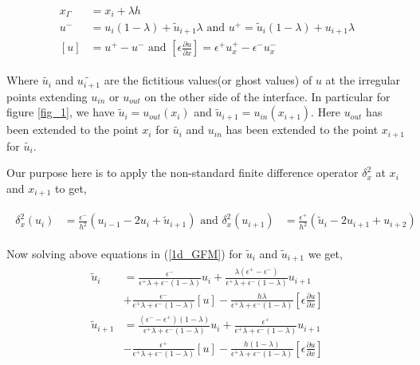 \begin{eqnarray}
\begin{aligned}
x_\Gamma &= x_i + \lambda h  \\
u^- &= u_i(1-\lambda )+ \tilde{u}_{i+1} \lambda \text{ and }u^+ = \tilde{u}_i(1-\lambda )+ u_{i+1} \lambda\\
\left[u\right]  & = u^+-u^- \text{ and }\left[ \epsilon \frac{\partial u}{\partial x} \right] =  \epsilon^+ u^+_x-\epsilon^- u^-_x
\end{aligned}\label{1d_GFM}
\end{eqnarray}
	
Where $\tilde{u_i}$ and $\tilde{u_{i+1}}$ are the fictitious values(or ghost values) of $u$ at the irregular points extending $u_{in}$ or $u_{out}$ on the other side of the interface. In particular for figure \ref{fig_1},  we have $\tilde{u}_i=u_{out}(x_i)$ and $\tilde{u}_{i+1}=u_{in}(x_{i+1})$. Here $u_{out}$ has been extended to the point $x_i$ for $\tilde{u_i}$ and $u_{in}$ has been extended to the point $x_{i+1}$ for $\tilde{u_i}$. 

Our purpose here is to apply the non-standard finite difference operator $\delta_x^2$ at $x_i$ and $x_{i+1}$ to get, 

\begin{eqnarray}
	\begin{aligned}
		\delta_x^2\left(u_{i}\right)&= \frac{\epsilon^-}{h^2} \left(u_{i-1}-2u_{i}+\tilde{u}_{i+1}\right)\text{ and }\delta_x^2\left(u_{i+1}\right)&= \frac{\epsilon^+}{h^2} \left(\tilde{u}_{i}-2u_{i+1}+u_{i+2}\right)
	\end{aligned}\label{fnt-op}
\end{eqnarray}

Now solving above equations in (\ref{1d_GFM})  for $\tilde{u}_i $ and $\tilde{u}_{i+1}$ we get, 
\begin{eqnarray}
\begin{aligned}
	\tilde{u}_i&= \frac{\epsilon^-}{\epsilon^+\lambda+\epsilon^-(1-\lambda)}u_i +\frac{\lambda(\epsilon^+-\epsilon^-)}{\epsilon^+\lambda+\epsilon^-(1-\lambda)}u_{i+1}\\ &+\frac{\epsilon^-}{\epsilon^+\lambda+\epsilon^-(1-\lambda)}\left[u\right] -\frac{h \lambda}{\epsilon^+\lambda+\epsilon^-(1-\lambda)}\left[ \epsilon \frac{\partial u}{\partial x} \right]\\
	\tilde{u}_{i+1}&= \frac{(\epsilon^--\epsilon^+)(1-\lambda)}{\epsilon^+\lambda+\epsilon^-(1-\lambda)} u_i +\frac{\epsilon^+}{\epsilon^+\lambda+\epsilon^-(1-\lambda)} u_{i+1} \\
	& -\frac{\epsilon^+}{\epsilon^+\lambda+\epsilon^-(1-\lambda)} \left[u\right] -\frac{h(1-\lambda)}{\epsilon^+\lambda+\epsilon^-(1-\lambda)}\left[ \epsilon \frac{\partial u}{\partial x} \right]\label{u_fact}
\end{aligned}
\end{eqnarray}


